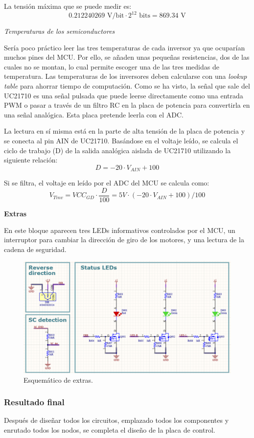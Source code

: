 La tensión máxima que se puede medir es:
\[ 0.212240269 \text{ V/bit} \cdot 2^{12} \text{ bits} = 869.34 \text{ V} \]

\textit{Temperaturas de los semiconductores}

Sería poco práctico leer las tres temperaturas de cada inversor ya que ocuparían muchos pines del MCU. Por ello, se añaden unas pequeñas resistencias, dos de las cuales no se montan, lo cual permite escoger una de las tres medidas de temperatura. Las temperaturas de los inversores deben calcularse con una \textit{lookup table} para ahorrar tiempo de computación. Como se ha visto, la señal que sale del UC21710 es una señal pulsada que puede leerse directamente como una entrada PWM o pasar a través de un filtro RC en la placa de potencia para convertirla en una señal analógica. Esta placa pretende leerla con el ADC.

La lectura en sí misma está en la parte de alta tensión de la placa de potencia y se conecta al pin AIN de UC21710. Basándose en el voltaje leído, se calcula el ciclo de trabajo (D) de la salida analógica aislada de UC21710 utilizando la siguiente relación: 
\[ D = -20 \cdot V_{AIN} + 100 \]

Si se filtra, el voltaje en leído por el ADC del MCU se calcula como:
\[ V_{Tinv} = VCC_{GD} \cdot \frac{D}{100} = 5V \cdot \left(-20 \cdot V_{AIN} + 100\right)/100 \]


\textbf{Extras}

En este bloque aparecen tres LEDs informativos controlados por el MCU, un interruptor para cambiar la dirección de giro de los motores, y una lectura de la cadena de seguridad.

\begin{figure}[H]
	\centering
	\includegraphics[width=0.7\linewidth]{fig/schEXTRAScontrol}
	\caption{Esquemático de extras.}
\end{figure}


\subsubsection{Resultado final}
Después de diseñar todos los circuitos, emplazado todos los componentes y enrutado todos los nodos, se completa el diseño de la placa de control.



